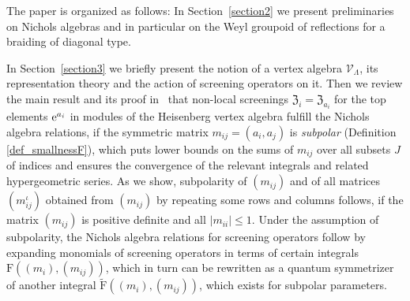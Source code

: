 \documentclass[pdftex]{sigma}%
\numberwithin{equation}{section}
\newcommand{\zem}{\mathfrak{Z}}
\begin{document}
The paper is organized as follows:
In Section~\ref{section2} we present preliminaries on Nichols algebras and in particular on the Weyl groupoid of reflections for a braiding of diagonal type.

In Section~\ref{section3} we briefly present the notion of a vertex algebra $\mathcal{V}_\Lambda$, its representation theory
and the action of screening operators on it. Then we review the main result and its proof in~\cite{Len17} that non-local screenings $\zem_i=\zem_{a_i}$ for the top elements ${\rm e}^{a_i}$ in modules of the Heisenberg vertex algebra fulfill the Nichols algebra relations, if the symmetric matrix $m_{ij}=(a_i,a_j)$ is \emph{subpolar} (Definition \ref{def_smallnessF}), which puts lower bounds on the sums of $m_{ij}$ over all subsets $J$ of indices and ensures the convergence of the relevant integrals and related hypergeometric series. As we show, subpolarity of $(m_{ij})$ and of all matrices $(m_{ij}^\iota)$ obtained from $(m_{ij})$ by repeating some rows and columns follows, if the matrix $(m_{ij})$ is positive definite and all $|m_{ii}|\leq 1$. Under the assumption of subpolarity, the Nichols algebra relations for screening operators follow by expanding monomials of screening operators in terms of certain integrals $\mathrm{F}((m_i),(m_{ij}))$, which in turn can be rewritten as a quantum symmetrizer of another integral $\tilde{\mathrm{F}}((m_i),(m_{ij}))$, which exists for subpolar parameters.
\end{document}
